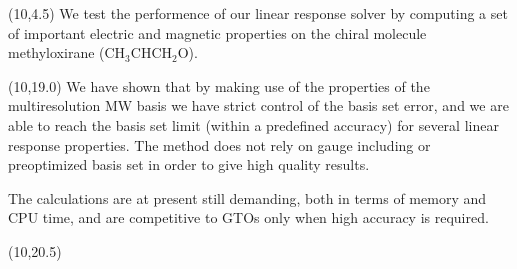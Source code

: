 \documentclass[a0,draft,portrait]{a0poster}
\def\LHead#1{\noindent{\LARGE\color{DarkBlue} #1}\smallskip}
\begin{document}

\begin{textblock}{7}(10,4.5)
We test the performence of our linear response solver by computing a set of
important electric and magnetic properties on the chiral molecule methyloxirane
(CH$_3$CHCH$_2$O).
\end{textblock}

\begin{textblock}{7}(10,19.0)
We have shown that by making use of the properties of the multiresolution
MW basis we have strict control of the basis set error, and we are able to 
reach the basis set limit (within a predefined accuracy) for several linear
response properties. The method does not rely on gauge including or 
preoptimized basis set in order to give high quality results.

The calculations are at present still demanding, both in terms of memory and CPU
time, and are competitive to GTOs only when high accuracy is required.
\end{textblock}

\begin{textblock}{7}(10,20.5)
\renewcommand\refname{\textnormal{\LHead{References}}}


%

\end{textblock}

\end{document}
